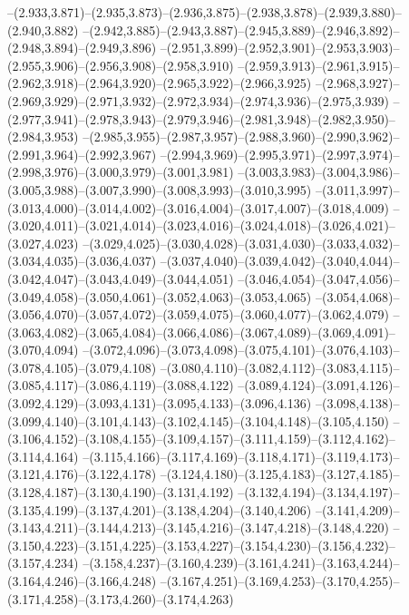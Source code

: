   --(2.933,3.871)--(2.935,3.873)--(2.936,3.875)--(2.938,3.878)--(2.939,3.880)--(2.940,3.882)%
  --(2.942,3.885)--(2.943,3.887)--(2.945,3.889)--(2.946,3.892)--(2.948,3.894)--(2.949,3.896)%
  --(2.951,3.899)--(2.952,3.901)--(2.953,3.903)--(2.955,3.906)--(2.956,3.908)--(2.958,3.910)%
  --(2.959,3.913)--(2.961,3.915)--(2.962,3.918)--(2.964,3.920)--(2.965,3.922)--(2.966,3.925)%
  --(2.968,3.927)--(2.969,3.929)--(2.971,3.932)--(2.972,3.934)--(2.974,3.936)--(2.975,3.939)%
  --(2.977,3.941)--(2.978,3.943)--(2.979,3.946)--(2.981,3.948)--(2.982,3.950)--(2.984,3.953)%
  --(2.985,3.955)--(2.987,3.957)--(2.988,3.960)--(2.990,3.962)--(2.991,3.964)--(2.992,3.967)%
  --(2.994,3.969)--(2.995,3.971)--(2.997,3.974)--(2.998,3.976)--(3.000,3.979)--(3.001,3.981)%
  --(3.003,3.983)--(3.004,3.986)--(3.005,3.988)--(3.007,3.990)--(3.008,3.993)--(3.010,3.995)%
  --(3.011,3.997)--(3.013,4.000)--(3.014,4.002)--(3.016,4.004)--(3.017,4.007)--(3.018,4.009)%
  --(3.020,4.011)--(3.021,4.014)--(3.023,4.016)--(3.024,4.018)--(3.026,4.021)--(3.027,4.023)%
  --(3.029,4.025)--(3.030,4.028)--(3.031,4.030)--(3.033,4.032)--(3.034,4.035)--(3.036,4.037)%
  --(3.037,4.040)--(3.039,4.042)--(3.040,4.044)--(3.042,4.047)--(3.043,4.049)--(3.044,4.051)%
  --(3.046,4.054)--(3.047,4.056)--(3.049,4.058)--(3.050,4.061)--(3.052,4.063)--(3.053,4.065)%
  --(3.054,4.068)--(3.056,4.070)--(3.057,4.072)--(3.059,4.075)--(3.060,4.077)--(3.062,4.079)%
  --(3.063,4.082)--(3.065,4.084)--(3.066,4.086)--(3.067,4.089)--(3.069,4.091)--(3.070,4.094)%
  --(3.072,4.096)--(3.073,4.098)--(3.075,4.101)--(3.076,4.103)--(3.078,4.105)--(3.079,4.108)%
  --(3.080,4.110)--(3.082,4.112)--(3.083,4.115)--(3.085,4.117)--(3.086,4.119)--(3.088,4.122)%
  --(3.089,4.124)--(3.091,4.126)--(3.092,4.129)--(3.093,4.131)--(3.095,4.133)--(3.096,4.136)%
  --(3.098,4.138)--(3.099,4.140)--(3.101,4.143)--(3.102,4.145)--(3.104,4.148)--(3.105,4.150)%
  --(3.106,4.152)--(3.108,4.155)--(3.109,4.157)--(3.111,4.159)--(3.112,4.162)--(3.114,4.164)%
  --(3.115,4.166)--(3.117,4.169)--(3.118,4.171)--(3.119,4.173)--(3.121,4.176)--(3.122,4.178)%
  --(3.124,4.180)--(3.125,4.183)--(3.127,4.185)--(3.128,4.187)--(3.130,4.190)--(3.131,4.192)%
  --(3.132,4.194)--(3.134,4.197)--(3.135,4.199)--(3.137,4.201)--(3.138,4.204)--(3.140,4.206)%
  --(3.141,4.209)--(3.143,4.211)--(3.144,4.213)--(3.145,4.216)--(3.147,4.218)--(3.148,4.220)%
  --(3.150,4.223)--(3.151,4.225)--(3.153,4.227)--(3.154,4.230)--(3.156,4.232)--(3.157,4.234)%
  --(3.158,4.237)--(3.160,4.239)--(3.161,4.241)--(3.163,4.244)--(3.164,4.246)--(3.166,4.248)%
  --(3.167,4.251)--(3.169,4.253)--(3.170,4.255)--(3.171,4.258)--(3.173,4.260)--(3.174,4.263)%
